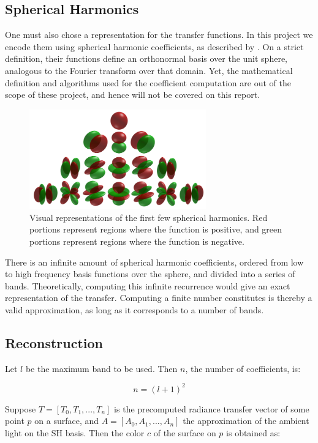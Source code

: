\documentclass[annual]{acmsiggraph}
\begin{document}
\subsection{Spherical Harmonics}

One must also chose a representation for the transfer functions. In this project we encode them using spherical harmonic coefficients, as described by \cite{sloan}. On a strict definition, their functions define an orthonormal basis over the unit sphere, analogous to the Fourier transform over that domain. Yet, the mathematical definition and algorithms used for the coefficient computation are out of the scope of these project, and hence will not be covered on this report.

\begin{figure}[ht]
  \centering
  \includegraphics[width=3in]{images/harmonics.png}
  \caption{Visual representations of the first few spherical harmonics. Red portions represent regions where the function is positive, and green portions represent regions where the function is negative.}
\end{figure}

There is an infinite amount of spherical harmonic coefficients, ordered from low to high frequency basis functions over the sphere, and divided into a series of bands.
Theoretically, computing this infinite recurrence would give an exact representation of the transfer. Computing a finite number constitutes is thereby a valid approximation, as long as it corresponds to a number of bands.

\subsection{Reconstruction}
Let $l$ be the maximum band to be used. Then $n$, the number of coefficients, is:

\begin{equation}
	n = (l + 1)^2
\end{equation}

Suppose $T = [T_{0}, T_{1}, ..., T_{n}]$ is the precomputed radiance transfer vector of some point $p$ on a surface, and $A = [A_{0}, A_{1}, ..., A_{n}]$ the approximation of the ambient light on the SH basis. Then the color $c$ of the surface on $p$ is obtained as:
\end{document}
